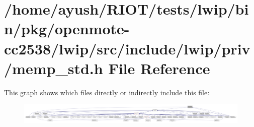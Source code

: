 \hypertarget{openmote-cc2538_2lwip_2src_2include_2lwip_2priv_2memp__std_8h}{}\section{/home/ayush/\+R\+I\+O\+T/tests/lwip/bin/pkg/openmote-\/cc2538/lwip/src/include/lwip/priv/memp\+\_\+std.h File Reference}
\label{openmote-cc2538_2lwip_2src_2include_2lwip_2priv_2memp__std_8h}
This graph shows which files directly or indirectly include this file\+:
\nopagebreak
\begin{figure}[H]
\begin{center}
\leavevmode
\includegraphics[width=350pt]{openmote-cc2538_2lwip_2src_2include_2lwip_2priv_2memp__std_8h__dep__incl}
\end{center}
\end{figure}
